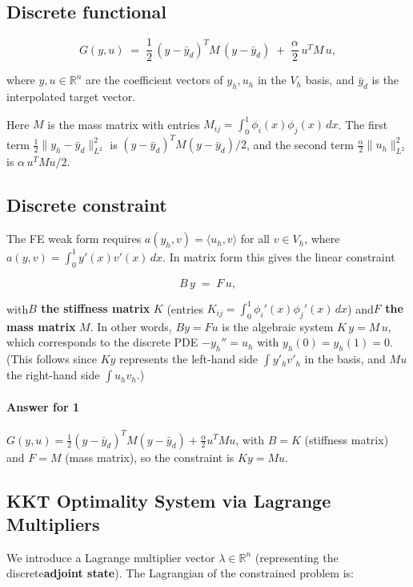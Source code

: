 \documentclass[a4paper,10pt]{article}
\begin{document}
\subsection{Discrete functional}

\[
	G(y,u) \;=\; \frac{1}{2}\,(y - \bar y_d)^T M\, (y - \bar y_d)\;+\;\frac{\alpha}{2}\,u^T M\,u,
\]

where \(y, u \in \mathbb{R}^n\) are the coefficient vectors of \(y_h, u_h\) in the \(V_h\) basis, and \(\bar y_d\) is the interpolated target vector.

Here \(M\) is the mass matrix with entries \(M_{ij}=\int_0^1 \phi_i(x)\phi_j(x)\,dx\). The first term \(\frac{1}{2}\|y_h - \bar y_d\|_{L^2}^2\) is \((y-\bar y_d)^T M (y-\bar y_d)/2\), and the second term \(\frac{\alpha}{2}\|u_h\|_{L^2}^2\) is \(\alpha\,u^T M u/2\).

\subsection{Discrete constraint}

The FE weak form requires \(a(y_h,v) = \langle u_h,v\rangle\) for all \(v\in V_h\), where \(a(y,v)=\int_0^1 y'(x)v'(x)\,dx\). In matrix form this gives the linear constraint

\[
	B\,y \;=\; F\,u,
\]

with\textbf{\(B\) the stiffness matrix} \(K\) (entries \(K_{ij}=\int_0^1 \phi_i'(x)\phi_j'(x)\,dx\)) and\textbf{\(F\) the mass matrix} \(M\).  In other words, \(By=Fu\) is the algebraic system \(K\,y = M\,u\), which corresponds to the discrete PDE \(-y_h''=u_h\) with \(y_h(0)=y_h(1)=0\). (This follows since \(K y\) represents the left-hand side \(\int y'_h v'_h\) in the basis, and \(M u\) the right-hand side \(\int u_h v_h\).)

\paragraph{Answer for 1}
\(G(y,u)=\frac12 (y-\bar y_d)^T M (y-\bar y_d) + \frac{\alpha}{2} u^T M u\), with \(B=K\) (stiffness matrix) and \(F=M\) (mass matrix), so the constraint is \(K y = M u\).

\subsection{KKT Optimality System via Lagrange Multipliers}

We introduce a Lagrange multiplier vector \(\lambda\in\mathbb{R}^n\) (representing the discrete\textbf{adjoint state}). The Lagrangian of the constrained problem is:
\end{document}
